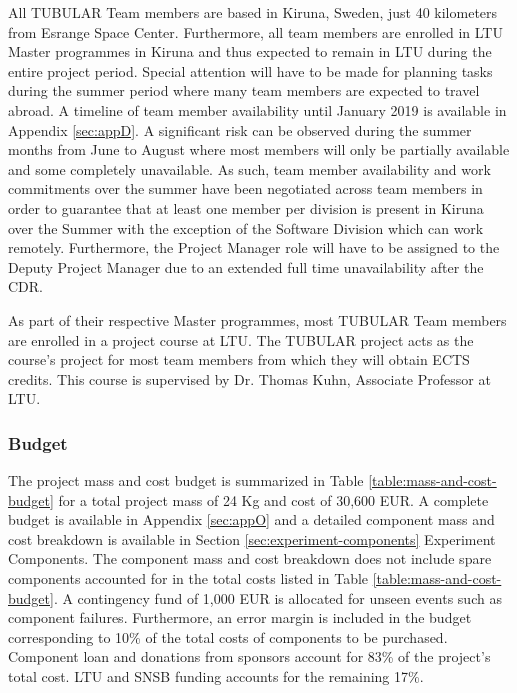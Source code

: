 \documentclass[a4paper,12pt,twoside]{article}
\begin{document}
All TUBULAR Team members are based in Kiruna, Sweden, just 40 kilometers from Esrange Space Center. Furthermore, all team members are enrolled in LTU Master programmes in Kiruna and thus expected to remain in LTU during the entire project period. Special attention will have to be made for planning tasks during the summer period where many team members are expected to travel abroad. A timeline of team member availability  until January 2019 is available in Appendix \ref{sec:appD}. A significant risk can be observed during the summer months from June to August where most members will only be partially available and some completely unavailable. As such, team member availability and work commitments over the summer have been negotiated across team members in order to guarantee that at least one member per division is present in Kiruna over the Summer with the exception of the Software Division which can work remotely. Furthermore, the Project Manager role will have to be assigned to the Deputy Project Manager due to an extended full time unavailability after the CDR.

As part of their respective Master programmes, most TUBULAR Team members are enrolled in a project course at LTU. The TUBULAR project acts as the course's project for most team members from which they will obtain ECTS credits. This course is supervised by Dr. Thomas Kuhn, Associate Professor at LTU.

\pagebreak
\subsubsection{Budget}
\label{sec:3.2.2}
The project mass and cost budget is summarized in Table \ref{table:mass-and-cost-budget} for a total project mass of 24 Kg and cost of 30,600 EUR. A complete budget is available in Appendix \ref{sec:appO} and a detailed component mass and cost breakdown is available in Section \ref{sec:experiment-components} Experiment Components. The component mass and cost breakdown does not include spare components accounted for in the total costs listed in Table \ref{table:mass-and-cost-budget}. A contingency fund of 1,000 EUR is allocated for unseen events such as component failures. Furthermore, an error margin is included in the budget corresponding to 10\% of the total costs of components to be purchased. Component loan and donations from sponsors account for 83\% of the project's total cost. LTU and SNSB funding accounts for the remaining 17\%. 
\end{document}
